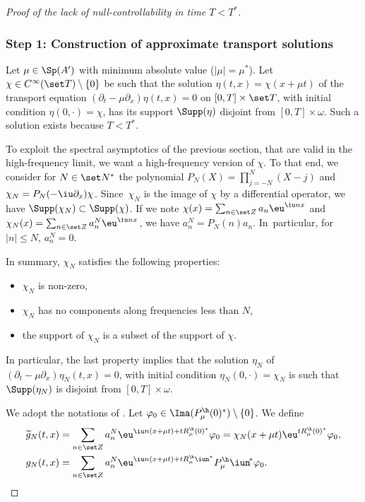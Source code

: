 \skpt
\begin{proof}[Proof of the lack of null-controllability in time $T<T^*$]

\subsubsection*{Step 1: Construction of approximate transport solutions} Let $\mu \in \Sp(A')$ with minimum absolute value (\ie $|\mu| = \mu^*$). Let $\chi\in C^\infty(\set T)\setminus\{0\}$ be such that the solution $\eta(t,x)=\chi(x+\mu t)$ of the transport equation $(\partial_t-\mu\partial_x)\eta(t,x) = 0$ on $[0,T]\times\set T$, with initial condition $\eta(0,\cdot) = \chi$, has its support $\Supp(\eta)$ disjoint from $[0,T]\times \omega$. Such a solution exists because $T<T^*$.

To exploit the spectral asymptotics of the previous section, that are valid in the high-frequency limit, we want a high-frequency version of $\chi$. To that end, we consider for $N\in\set N^*$ the polynomial $P_N(X) = \prod_{j=-N}^N(X-j)$ and $\chi_N = P_N(-\iu \partial_x)\chi$. Since~$\chi_N$ is the image of $\chi$ by a differential operator, we have $\Supp(\chi_N)\subset \Supp(\chi)$. If we note $\chi(x) = \sum_{n\in\set Z} a_n \eu^{\iu nx}$ and $\chi_N(x) = \sum_{n\in\set Z} a_n^N \eu^{\iu nx}$, we have $a_n^N = P_N(n) a_n$. In~particular, for $|n|\leq N$, $a_n^N = 0$.

In summary, $\chi_N$ satisfies the following properties:
\begin{itemize}
\item $\chi_N$ is non-zero,
\item $\chi_N$ has no components along frequencies less than $N$,
\item the support of $\chi_N$ is a subset of the support of $\chi$.
\end{itemize}
In particular, the last property implies that the solution $\eta_N$ of $(\partial_t-\mu\partial_x)\eta_N(t,x) = 0$, with initial condition $\eta_N(0,\cdot) = \chi_N$ is such that $\Supp(\eta_N)$ is disjoint from $[0,T]\times \omega$.

We adopt the notations of . Let $\varphi_0\in\Ima(P_\mu^\h(0)^*)\setminus\{0\}$. We define
\begin{align}
\widetilde g_N(t,x)
&= \sum_{n\in\set Z} a_n^N \eu^{\iu n(x+\mu t)+tR_\mu^\h(0)^*}\varphi_0
= \chi_N(x+\mu t)\eu^{tR_\mu^\h(0)^*}\varphi_0\label{eq:def_gN_approx},\\
g_N(t,x)
&=\sum_{n\in\set Z} a_n^N
\eu^{\iu n(x+\mu t) +tR_\mu^\h\iun^*}P_\mu^\h\iun^{\!*}\varphi_0. \label{eq:def_gN}
\end{align}


\end{proof}
